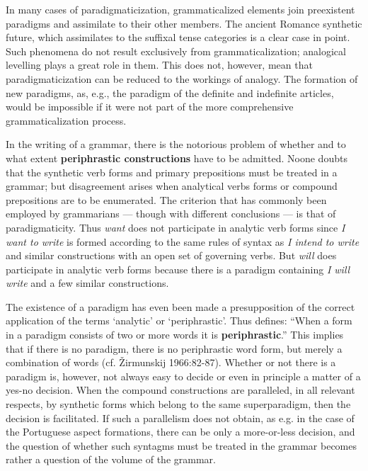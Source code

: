 In many cases of paradigmaticization, grammaticalized elements join preexistent paradigms and assimilate to their other members. The ancient Romance synthetic future, which assimilates to the suffixal tense categories is a clear case in point. Such phenomena do not result exclusively from grammaticalization; analogical levelling plays a great role in them. This does not, however, mean that paradigmaticization can be reduced to the workings of analogy. The formation of new paradigms, as, e.g., the paradigm of the definite and indefinite articles, would be impossible if it were not part of the more comprehensive grammaticalization process.

In the writing of a grammar, there is the notorious problem of whether and to what extent \textbf{periphrastic constructions} have to be admitted. Noone doubts that the synthetic verb forms and primary prepositions must be treated in a grammar; but disagreement arises when analytical verbs forms or compound prepositions are to be enumerated. The criterion that has commonly been employed by grammarians — though with different conclusions — is that of paradigmaticity. Thus \textit{want} does not participate in analytic verb forms since \textit{I want to write} is formed according to the same rules of syntax as \textit{I intend to write} and similar constructions with an open set of governing verbs. But \textit{will} does participate in analytic verb forms because there is a paradigm containing \textit{I will write} and a few similar constructions.%

The existence of a paradigm has even been made a presupposition of the correct application of the terms ‘analytic’ or ‘periphrastic’. Thus \citet[55]{Matthews1981} defines: “When a form in a paradigm consists of two or more words it is \textbf{periphrastic}.” This implies that if there is no paradigm, there is no periphrastic word form, but merely a combination of words (cf. Žirmunskij 1966:82-87). Whether or not there is a paradigm is, however, not always easy to decide or even in principle a matter of a yes-no decision. When the compound constructions are paralleled, in all relevant respects, by synthetic forms which belong to the same superparadigm, then the decision is facilitated. If such a parallelism does not obtain, as e.g. in the case of the Portuguese aspect formations, there can be only a more-or-less decision, and the question of whether such syntagms must be treated in the grammar becomes rather a question of the volume of the grammar.

